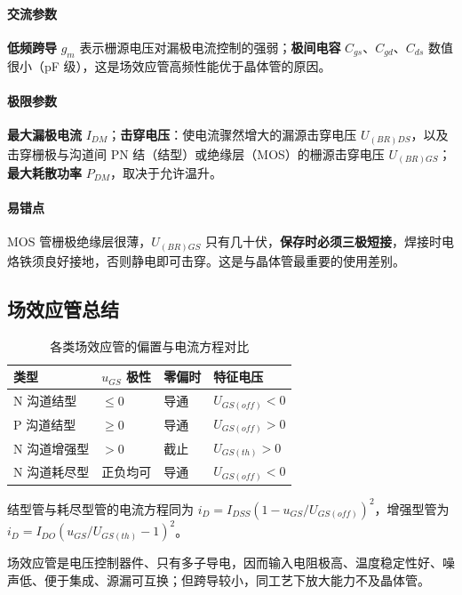 \paragraph{交流参数} \textbf{低频跨导} $g_m$ 表示栅源电压对漏极电流控制的强弱；\textbf{极间电容} $C_{gs}$、$C_{gd}$、$C_{ds}$ 数值很小（pF 级），这是场效应管高频性能优于晶体管的原因。

\paragraph{极限参数} \textbf{最大漏极电流} $I_{DM}$；\textbf{击穿电压}：使电流骤然增大的漏源击穿电压 $U_{(BR)DS}$，以及击穿栅极与沟道间 PN 结（结型）或绝缘层（MOS）的栅源击穿电压 $U_{(BR)GS}$；\textbf{最大耗散功率} $P_{DM}$，取决于允许温升。

\paragraph{易错点} MOS 管栅极绝缘层很薄，$U_{(BR)GS}$ 只有几十伏，\textbf{保存时必须三极短接}，焊接时电烙铁须良好接地，否则静电即可击穿。这是与晶体管最重要的使用差别。

\subsection{场效应管总结}

\begin{table}[htbp]
\centering
\caption{各类场效应管的偏置与电流方程对比}
\begin{tabular}{@{}llll@{}}
\hline
类型 & $u_{GS}$ 极性 & 零偏时 & 特征电压 \\
\hline
N 沟道结型 & $\le0$ & 导通 & $U_{GS(off)}<0$ \\
P 沟道结型 & $\ge0$ & 导通 & $U_{GS(off)}>0$ \\
N 沟道增强型 & $>0$ & 截止 & $U_{GS(th)}>0$ \\
N 沟道耗尽型 & 正负均可 & 导通 & $U_{GS(off)}<0$ \\
\hline
\end{tabular}
\end{table}

结型管与耗尽型管的电流方程同为 $i_D=I_{DSS}(1-u_{GS}/U_{GS(off)})^2$，增强型管为 $i_D=I_{DO}(u_{GS}/U_{GS(th)}-1)^2$。

场效应管是电压控制器件、只有多子导电，因而输入电阻极高、温度稳定性好、噪声低、便于集成、源漏可互换；但跨导较小，同工艺下放大能力不及晶体管。
